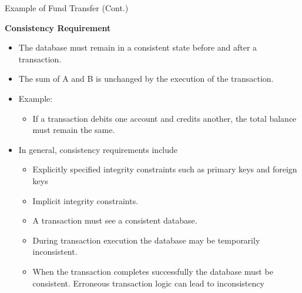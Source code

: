 \documentclass[aspectratio=169]{beamer}
\begin{document}
\begin{frame}{Example of Fund Transfer (Cont.)}

    \scriptsize
    \textbf{Consistency Requirement}
    \begin{itemize}
        \item The database must remain in a consistent state before and after a transaction.
        \item The sum of A and B is unchanged by the execution of the transaction.
        \item Example:
        \begin{itemize}
            \scriptsize
            \item If a transaction debits one account and credits another, the total balance must remain the same.
        \end{itemize}
        \item In general, consistency requirements include
            \begin{itemize}
                \scriptsize
                \item Explicitly specified integrity constraints such as primary keys and foreign keys
                \item Implicit integrity constraints.
                \item A transaction must see a consistent database.
                \item During transaction execution the database may be temporarily inconsistent.
                \item When the transaction completes successfully the database must be consistent. Erroneous transaction logic can lead to inconsistency
            \end{itemize}
    \end{itemize}

\end{frame}
\end{document}
